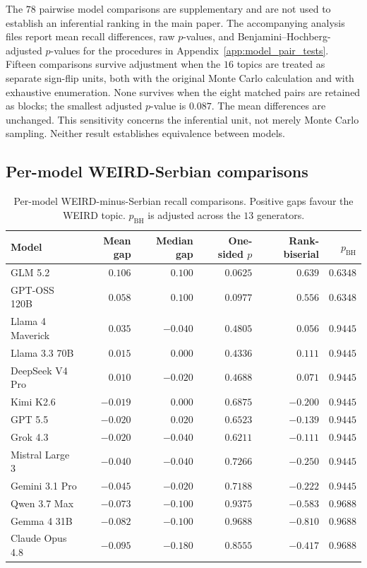 \documentclass[11pt,a4paper]{article}
\begin{document}
The $78$ pairwise model comparisons are supplementary and are not used to establish an inferential ranking in the main paper. The accompanying analysis files report mean recall differences, raw $p$-values, and Benjamini--Hochberg-adjusted $p$-values for the procedures in Appendix~\ref{app:model_pair_tests}. Fifteen comparisons survive adjustment when the $16$ topics are treated as separate sign-flip units, both with the original Monte Carlo calculation and with exhaustive enumeration. None survives when the eight matched pairs are retained as blocks; the smallest adjusted $p$-value is $0.087$. The mean differences are unchanged. This sensitivity concerns the inferential unit, not merely Monte Carlo sampling. Neither result establishes equivalence between models.

\subsection{Per-model WEIRD-Serbian comparisons}
\label{app:per_model_results}
\begin{table}[t]
\centering
\small
\caption{Per-model WEIRD-minus-Serbian recall comparisons.
Positive gaps favour the WEIRD topic.
$p_{\mathrm{BH}}$ is adjusted across the $13$ generators.}
\label{tab:per_model_weird_gap}

\begin{tabular}{lrrrrr}
\toprule
\textbf{Model} &
\textbf{Mean gap} &
\textbf{Median gap} &
\textbf{One-sided $p$} &
\textbf{Rank-biserial} &
\textbf{$p_{\mathrm{BH}}$} \\
\midrule
GLM 5.2 & $0.106$ & $0.100$ & $0.0625$ & $0.639$ & $0.6348$ \\
GPT-OSS 120B & $0.058$ & $0.100$ & $0.0977$ & $0.556$ & $0.6348$ \\
Llama 4 Maverick & $0.035$ & $-0.040$ & $0.4805$ & $0.056$ & $0.9445$ \\
Llama 3.3 70B & $0.015$ & $0.000$ & $0.4336$ & $0.111$ & $0.9445$ \\
DeepSeek V4 Pro & $0.010$ & $-0.020$ & $0.4688$ & $0.071$ & $0.9445$ \\
Kimi K2.6 & $-0.019$ & $0.000$ & $0.6875$ & $-0.200$ & $0.9445$ \\
GPT 5.5 & $-0.020$ & $0.020$ & $0.6523$ & $-0.139$ & $0.9445$ \\
Grok 4.3 & $-0.020$ & $-0.040$ & $0.6211$ & $-0.111$ & $0.9445$ \\
Mistral Large 3 & $-0.040$ & $-0.040$ & $0.7266$ & $-0.250$ & $0.9445$ \\
Gemini 3.1 Pro & $-0.045$ & $-0.020$ & $0.7188$ & $-0.222$ & $0.9445$ \\
Qwen 3.7 Max & $-0.073$ & $-0.100$ & $0.9375$ & $-0.583$ & $0.9688$ \\
Gemma 4 31B & $-0.082$ & $-0.100$ & $0.9688$ & $-0.810$ & $0.9688$ \\
Claude Opus 4.8 & $-0.095$ & $-0.180$ & $0.8555$ & $-0.417$ & $0.9688$ \\
\bottomrule
\end{tabular}
\end{table}
\end{document}
